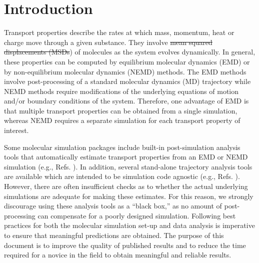 \documentclass[9pt,bestpractices]{livecoms}
\providecommand{\DIFadd}[1]{{\protect\color{blue}\uwave{#1}}} %
\providecommand{\DIFdel}[1]{{\protect\color{red}\sout{#1}}}                      %
\providecommand{\DIFaddbegin}{} %
\providecommand{\DIFaddend}{} %
\providecommand{\DIFdelbegin}{} %
\providecommand{\DIFdelend}{} %
\begin{document}
\section{Introduction}

Transport properties describe the rates at which mass, momentum, heat or charge move through a given substance. They involve \DIFdelbegin \DIFdel{mean squared displacements (MSDs}\DIFdelend \DIFaddbegin \DIFadd{the mean squared displacement (MSD}\DIFaddend ) of molecules as the system evolves dynamically. In general, these properties can be computed by equilibrium molecular dynamics (EMD) or by non-equilibrium molecular dynamics (NEMD) methods. The EMD methods involve post-processing of a standard molecular dynamics (MD) trajectory while NEMD methods require modifications of the underlying equations of motion and/or boundary conditions of the system. Therefore, one advantage of EMD is that multiple transport properties can be obtained from a single simulation, whereas NEMD requires a separate simulation for each transport property of interest.

Some molecular simulation packages include built-in post-simulation analysis tools that automatically estimate transport properties from an EMD or NEMD simulation (e.g., Refs. \cite{LAMMPS,GROMACS,AMBER2018,NAMD,Brooks2009,ms2}). In addition, several stand-alone trajectory analysis tools are available which are intended to be simulation code agnostic (e.g., Refs. \cite{Roe2013,MDTraj,VMD}). However, there are often insufficient checks as to whether the actual underlying simulations are adequate for making these estimates. For this reason, we strongly discourage using these analysis tools as a ``black box,'' as no amount of post-processing can compensate for a poorly designed simulation. Following best practices for both the molecular simulation set-up and data analysis is imperative to ensure that meaningful predictions are obtained. The purpose of this document is to improve the quality of published results and to reduce the time required for a novice in the field to obtain meaningful and reliable results.
\end{document}

